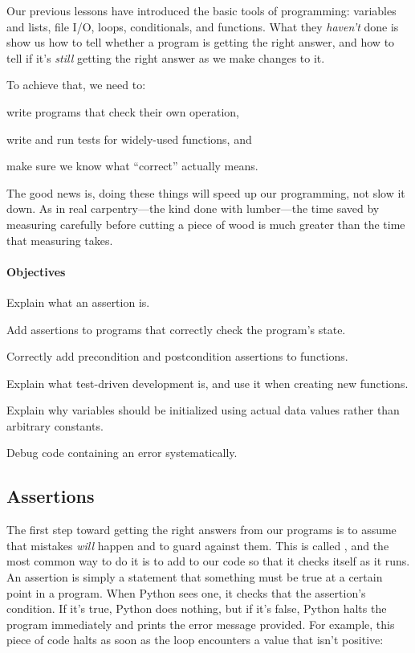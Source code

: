 \documentclass{book}
\begin{document}
Our previous lessons have introduced the basic tools of programming:
variables and lists, file I/O, loops, conditionals, and functions. What
they \emph{haven't} done is show us how to tell whether a program is
getting the right answer, and how to tell if it's \emph{still} getting
the right answer as we make changes to it.

To achieve that, we need to:

\begin{swcitemize}
\item
  write programs that check their own operation,
\item
  write and run tests for widely-used functions, and
\item
  make sure we know what ``correct'' actually means.
\end{swcitemize}

The good news is, doing these things will speed up our programming, not
slow it down. As in real carpentry---the kind done with lumber---the
time saved by measuring carefully before cutting a piece of wood is much
greater than the time that measuring takes.

\mbox{}\paragraph{Objectives}

\begin{swcitemize}
\item
  Explain what an assertion is.
\item
  Add assertions to programs that correctly check the program's state.
\item
  Correctly add precondition and postcondition assertions to functions.
\item
  Explain what test-driven development is, and use it when creating new
  functions.
\item
  Explain why variables should be initialized using actual data values
  rather than arbitrary constants.
\item
  Debug code containing an error systematically.
\end{swcitemize}

\subsection{Assertions}

The first step toward getting the right answers from our programs is to
assume that mistakes \emph{will} happen and to guard against them. This
is called , and
the most common way to do it is to add
 to our code so that it checks itself
as it runs. An assertion is simply a statement that something must be
true at a certain point in a program. When Python sees one, it checks
that the assertion's condition. If it's true, Python does nothing, but
if it's false, Python halts the program immediately and prints the error
message provided. For example, this piece of code halts as soon as the
loop encounters a value that isn't positive:
\end{document}
